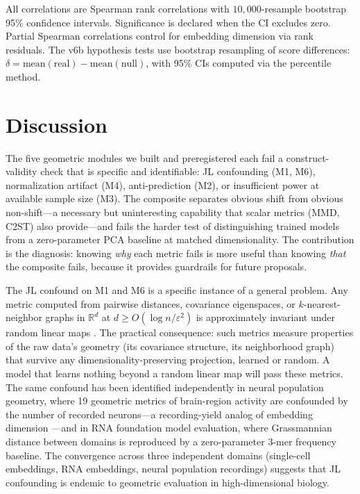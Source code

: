 \documentclass[9pt,lineno]{elife}
\begin{document}
All correlations are Spearman rank correlations with $10{,}000$-resample bootstrap 95\% confidence intervals. Significance is declared when the CI excludes zero. Partial Spearman correlations control for embedding dimension via rank residuals. The v6b hypothesis tests use bootstrap resampling of score differences: $\delta = \text{mean}(\text{real}) - \text{mean}(\text{null})$, with 95\% CIs computed via the percentile method.


\section{Discussion}

The five geometric modules we built and preregistered each fail a construct-validity check that is specific and identifiable: JL confounding (M1, M6), normalization artifact (M4), anti-prediction (M2), or insufficient power at available sample size (M3). The composite separates obvious shift from obvious non-shift---a necessary but uninteresting capability that scalar metrics (MMD, C2ST) also provide---and fails the harder test of distinguishing trained models from a zero-parameter PCA baseline at matched dimensionality. The contribution is the diagnosis: knowing \emph{why} each metric fails is more useful than knowing \emph{that} the composite fails, because it provides guardrails for future proposals.

The JL confound on M1 and M6 is a specific instance of a general problem. Any metric computed from pairwise distances, covariance eigenspaces, or $k$-nearest-neighbor graphs in $\mathbb{R}^d$ at $d \geq O(\log n / \varepsilon^2)$ is approximately invariant under random linear maps \citep{johnsonlindenstrauss1984}. The practical consequence: such metrics measure properties of the raw data's geometry (its covariance structure, its neighborhood graph) that survive any dimensionality-preserving projection, learned or random. A model that learns nothing beyond a random linear map will pass these metrics. The same confound has been identified independently in neural population geometry, where 19 geometric metrics of brain-region activity are confounded by the number of recorded neurons---a recording-yield analog of embedding dimension \citep{tower2026bracket}---and in RNA foundation model evaluation, where Grassmannian distance between domains is reproduced by a zero-parameter 3-mer frequency baseline. The convergence across three independent domains (single-cell embeddings, RNA embeddings, neural population recordings) suggests that JL confounding is endemic to geometric evaluation in high-dimensional biology.
\end{document}
